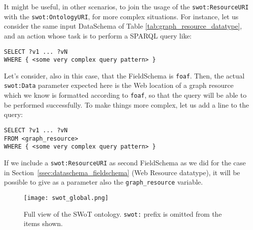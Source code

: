 It might be useful, in other scenarios, to join the usage of the \texttt{swot:ResourceURI} with the \texttt{swot:OntologyURI}, for more complex situations. For instance, let us consider the same input DataSchema of Table \ref{tab:graph_resource_datatype}, and an action whose task is to perform a SPARQL query like:

\begin{lstlisting}
SELECT ?v1 ... ?vN 
WHERE { <some very complex query pattern> }
\end{lstlisting}

Let's consider, also in this case, that the FieldSchema is \texttt{foaf}. Then, the actual \texttt{swot:Data} parameter expected here is the Web location of a graph resource which we know is formatted according to \texttt{foaf}, so that the query will be able to be performed successfully. To make things more complex, let us add a line to the query:
\begin{lstlisting}
SELECT ?v1 ... ?vN 
FROM <graph_resource>
WHERE { <some very complex query pattern> }
\end{lstlisting}
If we include a \texttt{swot:ResourceURI} as second FieldSchema as we did for the case in Section~\ref{ssec:dataschema_fieldschema} (Web Resource datatype), it will be possible to give as a parameter also the \texttt{graph\_resource} variable.

\begin{figure*}[h]
\centering
\vspace{10pt}
\texttt{[image: swot\_global.png]}
\vspace{10pt}
\caption{Full view of the SWoT ontology. \texttt{swot:} prefix is omitted from the items shown.}
\label{fig:full_ontology}
\end{figure*}